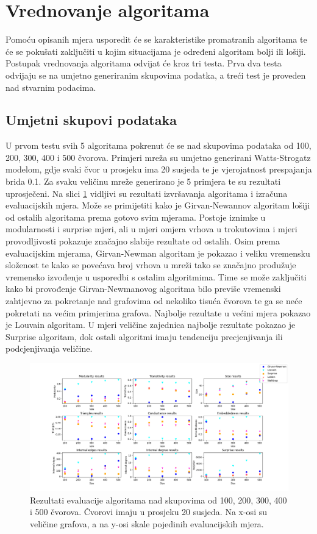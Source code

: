 \section{Vrednovanje algoritama}
Pomoću opisanih mjera usporedit će se karakteristike promatranih algoritama te će se pokušati zaključiti u kojim situacijama je određeni algoritam bolji ili lošiji. Postupak vrednovanja algoritama odvijat će kroz tri testa.  Prva dva testa odvijaju se na umjetno generiranim skupovima podatka, a treći test je proveden nad stvarnim podacima.

\subsection{Umjetni skupovi podataka}
U prvom testu svih 5 algoritama pokrenut će se nad skupovima podataka od 100, 200, 300, 400 i 500 čvorova. Primjeri mreža su umjetno generirani Watts-Strogatz modelom, gdje svaki čvor u prosjeku ima 20 susjeda te je vjerojatnost prespajanja brida 0.1. Za svaku veličinu mreže generirano je 5 primjera te su rezultati uprosječeni. Na slici \ref{fig:test1} vidljivi su rezultati izvršavanja algoritama i izračuna evaluacijskih mjera. Može se primijetiti kako je Girvan-Newannov algoritam lošiji od ostalih algoritama prema gotovo svim mjerama. Postoje iznimke u modularnosti i surprise mjeri, ali u mjeri omjera vrhova u trokutovima i  mjeri provodljivosti pokazuje značajno slabije rezultate od ostalih. Osim prema evaluacijskim mjerama, Girvan-Newman algoritam je pokazao i veliku vremensku složenost te kako se povećava broj vrhova u mreži tako se značajno produžuje vremensko izvođenje u usporedbi s ostalim algoritmima. Time se može zaključiti kako bi provođenje Girvan-Newmanovog algoritma bilo previše vremenski zahtjevno za pokretanje nad grafovima od nekoliko tisuća čvorova te ga se neće pokretati na većim primjerima grafova. Najbolje rezultate u većini mjera pokazao je Louvain algoritam. U mjeri veličine zajednica najbolje rezultate pokazao je Surprise algoritam, dok ostali algoritmi imaju tendenciju precjenjivanja ili podcjenjivanja veličine.

\begin{figure}
	\includegraphics[width=\linewidth]{images/test1.png}
	\caption{Rezultati evaluacije algoritama nad skupovima od 100, 200, 300, 400 i 500 čvorova. Čvorovi imaju u prosjeku 20 susjeda. Na x-osi su veličine grafova, a na y-osi skale pojedinih evaluacijskih mjera.}
	\label{fig:test1}
\end{figure}

